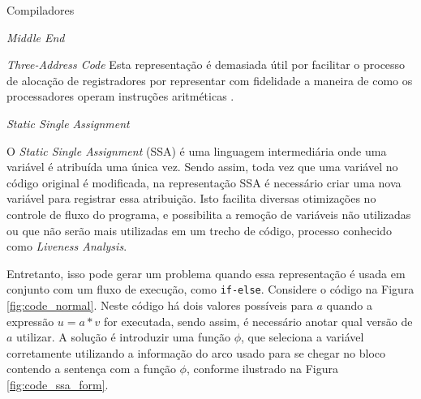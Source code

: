 \begin{section}{Compiladores}
\begin{subsection}{\textit{Middle End}}
\begin{subsubsection}{\textit{Three-Address Code}}
Esta representação é demasiada útil por facilitar o processo de alocação
de registradores por representar com fidelidade a maneira de como os processadores
operam instruções aritméticas \citep{lattner2002llvm}.

\end{subsubsection}
\begin{subsubsection}{\textit{Static Single Assignment}}

O \textit{Static Single Assignment} (SSA) é uma linguagem intermediária
onde uma variável é atribuída uma única vez. Sendo assim, toda vez que
uma variável no código original é modificada, na representação SSA é necessário criar uma
nova variável para registrar essa atribuição. Isto facilita diversas
otimizações no controle de fluxo do programa, e possibilita a remoção
de variáveis não utilizadas ou que não serão mais utilizadas em um
trecho de código, processo conhecido como \textit{Liveness Analysis}.

\vspace*{-0.5cm}
Entretanto, isso pode gerar um problema quando essa representação é
    usada em conjunto com um fluxo de execução, como \texttt{if-else}. Considere o código
na Figura \ref{fig:code_normal}. Neste código há dois valores possíveis para
$a$ quando a expressão $u = a*v$ for executada, sendo assim, é necessário
anotar qual versão de $a$ utilizar. A solução é introduzir uma
função $\phi$, que seleciona a variável corretamente utilizando a informação
do arco usado para se chegar no bloco contendo a sentença com a função $\phi$,
conforme ilustrado na Figura \ref{fig:code_ssa_form}.

\begin{figure}[ht]
    \centering
    \begin{subfigure}[b]{0.40\textwidth}


\end{subfigure}
\end{figure}
\end{subsubsection}
\end{subsection}
\end{section}
